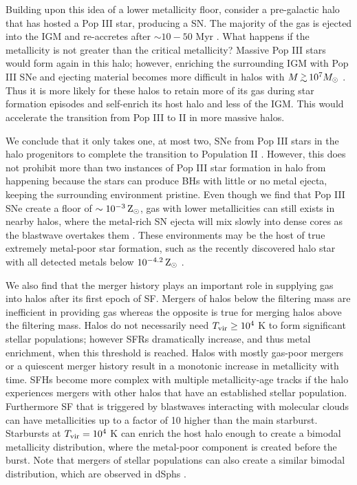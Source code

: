 \documentclass[apj]{emulateapj}
\begin{document}
Building upon this idea of a lower metallicity floor, consider a
pre-galactic halo that has hosted a Pop III star, producing a SN.  The
majority of the gas is ejected into the IGM and re-accretes after
$\sim 10-50$ Myr \citep{Johnson07, Wise08_Gal}.  What happens if the
metallicity is not greater than the critical metallicity?  Massive Pop
III stars would form again in this halo; however, enriching the
surrounding IGM with Pop III SNe and ejecting material becomes more
difficult in halos with $M \gsim 10^7 \Ms$ \citep{Whalen08_SN}.  Thus
it is more likely for these halos to retain more of its gas during
star formation episodes and self-enrich its host halo and less of the
IGM.  This would accelerate the transition from Pop III to II in more
massive halos.

We conclude that it only takes one, at most two, SNe from Pop III
stars in the halo progenitors to complete the transition to Population
II \citep{Frebel10}.  However, this does not prohibit more than two
instances of Pop III star formation in halo from happening because the
stars can produce BHs with little or no metal ejecta, keeping the
surrounding environment pristine.  Even though we find that Pop III
SNe create a floor of $\sim 10^{-3} {\rm\,Z_\odot}$, gas with lower
metallicities can still exists in nearby halos, where the metal-rich
SN ejecta will mix slowly into dense cores as the blastwave overtakes
them \citep{Cen08}.  These environments may be the host of true
extremely metal-poor star formation, such as the recently discovered
halo star with all detected metals below $10^{-4.2} {\rm\,Z_\odot}$
\citep{Caffau11}.

We also find that the merger history plays an important role in
supplying gas into halos after its first epoch of SF.  Mergers of
halos below the filtering mass are inefficient in providing gas
whereas the opposite is true for merging halos above the filtering
mass.  Halos do not necessarily need $\tvir \ge 10^4$ K to form
significant stellar populations; however SFRs dramatically increase,
and thus metal enrichment, when this threshold is reached.  Halos with
mostly gas-poor mergers or a quiescent merger history result in a
monotonic increase in metallicity with time.  SFHs become more complex
with multiple metallicity-age tracks if the halo experiences mergers
with other halos that have an established stellar population.
Furthermore SF that is triggered by blastwaves interacting with
molecular clouds can have metallicities up to a factor of 10 higher
than the main starburst.  Starbursts at $\tvir = 10^4$ K can enrich
the host halo enough to create a bimodal metallicity distribution,
where the metal-poor component is created before the burst.  Note that
mergers of stellar populations can also create a similar bimodal
distribution, which are observed in dSphs \citep{Battaglia11}.
\end{document}
